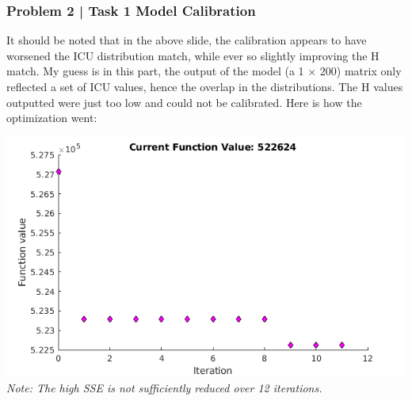 \documentclass[aspectratio=1610]{beamer}
\begin{document}
\begin{frame}
\frametitle{Problem 2 | Task 1 Model Calibration}

\footnotesize{It should be noted that in the above slide, the calibration appears to have worsened the ICU distribution match, while ever so slightly improving the H match. My guess is in this part, the output of the model (a 1 $\times$ 200) matrix only reflected a set of ICU values, hence the overlap in the distributions. The H values outputted were just too low and could not be calibrated. Here is how the optimization went:}
\vspace{1em}

\centering
\includegraphics[width = .65\textwidth]{cost1}\\

\textit{Note: The high SSE is not sufficiently reduced over 12 iterations.}

\end{frame}
\end{document}
